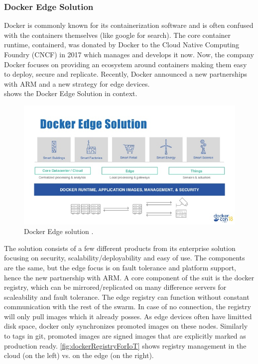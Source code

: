 \subsubsection{Docker Edge Solution}
Docker is commonly known for its containerization software and is often confused with the containers themselves (like google for search). The core container runtime, containerd, was donated by Docker to the Cloud Native Computing Foundry (CNCF) in 2017\cite{containerDonationDocker79:online} which manages and develops it now. Now, the company Docker focuses on providing an ecosystem around containers making them easy to deploy, secure and replicate. Recently, Docker announced a new partnerships with ARM and  a new strategy for edge devices.\\
 shows the Docker Edge Solution in context. 
\begin{figure}[h!]
    \centering
    \includegraphics[scale=0.65]{figures/docker-edge-solution.jpg}
    \caption{Docker Edge solution .}
    \label{fig:dockerEdge}
\end{figure}
The solution consists of a few different products from its enterprise solution focusing on security, scalability/deployability and easy of use. The components are the same, but the edge focus is on fault tolerance and platform support, hence the new partnership with ARM. A core component of the suit is the docker registry, which can be mirrored/replicated on many difference servers for scaleability and fault tolerance. The edge registry can function without constant communication with the rest of the swarm. In case of no connection, the registry will only pull images which it already posses. As edge devices often have limitted disk space, docker only synchronizes promoted images on these nodes. Similarly to tags in git, promoted images are signed images that are explicitly marked as production ready. \cref{fig:dockerRegistryForIoT} shows registry management in the cloud (on the left) vs. on the edge (on the right).
